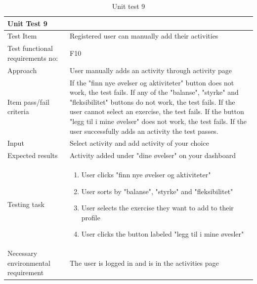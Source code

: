 \begin{table}[H]
\begin{tabular}{ | L{0.25\linewidth} | L{0.75\linewidth} | } 
 \hline {}
 Unit Test 9 &  \\
 \hline
 Test Item & Registered user can manually add their activities \\ 
 \hline
 Test functional requirements no: & F10
 \\ 
 \hline
 Approach & User manually adds an activity through activity page\\
  \hline
 Item pass/fail criteria & If the "finn nye øvelser og aktiviteter" button does not work, the test fails. If any of the "balanse", "styrke" and "fleksibilitet" buttons do not work, the test fails. If the user cannot select an exercise, the test fails. If the button "legg til i mine øvelser" does not work, the test fails. If the user successfully adds an activity the test passes.\\
 \hline
 Input &  Select activity and add activity of your choice\\ 
 \hline
 Expected results & Activity added under "dine øvelser" on your dashboard \\ 
  \hline
Testing task & 
\vspace{-5mm}
    \begin{enumerate}[noitemsep]
  \item User clicks "finn nye øvelser og aktiviteter"
  \item User sorts by "balanse", "styrke" and "fleksibilitet"
  \item User selects the exercise they want to add to their profile
  \item User clicks the button labeled "legg til i mine øvesler"
   \end{enumerate}\\
 \hline
 Necessary environmental requirement & The user is logged in and is in the activities page \\ 
 \hline
\end{tabular}
\caption{Unit test 9}
\end{table}

